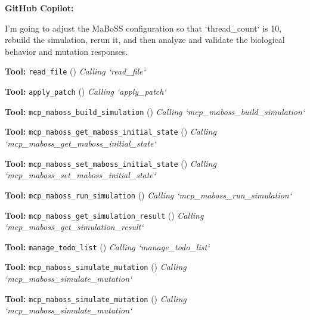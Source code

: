 \documentclass[11pt,a4paper]{article}
\begin{document}
\begin{copilotbox}
\textbf{GitHub Copilot:}

I’m going to adjust the MaBoSS configuration so that `thread\_count` is 10, rebuild the simulation, rerun it, and then analyze and validate the biological behavior and mutation responses.

\end{copilotbox}
\begin{toolokbox}
\textbf{Tool:} \texttt{read\_file} (\checkmark)
\textit{Calling `read\_file`}
\end{toolokbox}
\begin{toolokbox}
\textbf{Tool:} \texttt{apply\_patch} (\checkmark)
\textit{Calling `apply\_patch`}
\end{toolokbox}
\begin{toolokbox}
\textbf{Tool:} \texttt{mcp\_maboss\_build\_simulation} (\checkmark)
\textit{Calling `mcp\_maboss\_build\_simulation`}
\end{toolokbox}
\begin{toolokbox}
\textbf{Tool:} \texttt{mcp\_maboss\_get\_maboss\_initial\_state} (\checkmark)
\textit{Calling `mcp\_maboss\_get\_maboss\_initial\_state`}
\end{toolokbox}
\begin{toolokbox}
\textbf{Tool:} \texttt{mcp\_maboss\_set\_maboss\_initial\_state} (\checkmark)
\textit{Calling `mcp\_maboss\_set\_maboss\_initial\_state`}
\end{toolokbox}
\begin{toolokbox}
\textbf{Tool:} \texttt{mcp\_maboss\_run\_simulation} (\checkmark)
\textit{Calling `mcp\_maboss\_run\_simulation`}
\end{toolokbox}
\begin{toolokbox}
\textbf{Tool:} \texttt{mcp\_maboss\_get\_simulation\_result} (\checkmark)
\textit{Calling `mcp\_maboss\_get\_simulation\_result`}
\end{toolokbox}
\begin{toolokbox}
\textbf{Tool:} \texttt{manage\_todo\_list} (\checkmark)
\textit{Calling `manage\_todo\_list`}
\end{toolokbox}
\begin{toolokbox}
\textbf{Tool:} \texttt{mcp\_maboss\_simulate\_mutation} (\checkmark)
\textit{Calling `mcp\_maboss\_simulate\_mutation`}
\end{toolokbox}
\begin{toolokbox}
\textbf{Tool:} \texttt{mcp\_maboss\_simulate\_mutation} (\checkmark)
\textit{Calling `mcp\_maboss\_simulate\_mutation`}
\end{toolokbox}
\end{document}
